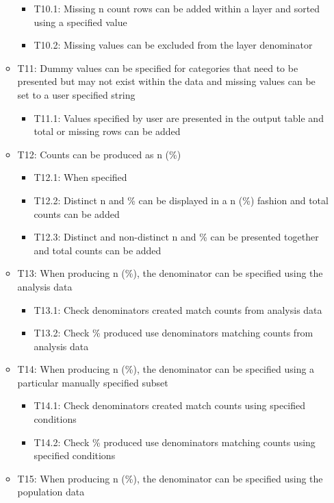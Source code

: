\documentclass[
]{article}
\providecommand{\tightlist}{%
  \setlength{\itemsep}{0pt}\setlength{\parskip}{0pt}}
\begin{document}
\begin{itemize}
\begin{itemize}
    \begin{itemize}
    \tightlist
    \item
      T10.1: Missing n count rows can be added within a layer and sorted
      using a specified value
    \item
      T10.2: Missing values can be excluded from the layer denominator
    \end{itemize}
  \item
    T11: Dummy values can be specified for categories that need to be
    presented but may not exist within the data and missing values can
    be set to a user specified string

    \begin{itemize}
    \tightlist
    \item
      T11.1: Values specified by user are presented in the output table
      and total or missing rows can be added
    \end{itemize}
  \item
    T12: Counts can be produced as n (\%)

    \begin{itemize}
    \tightlist
    \item
      T12.1: When specified
    \item
      T12.2: Distinct n and \% can be displayed in a n (\%) fashion and
      total counts can be added
    \item
      T12.3: Distinct and non-distinct n and \% can be presented
      together and total counts can be added
    \end{itemize}
  \item
    T13: When producing n (\%), the denominator can be specified using
    the analysis data

    \begin{itemize}
    \tightlist
    \item
      T13.1: Check denominators created match counts from analysis data
    \item
      T13.2: Check \% produced use denominators matching counts from
      analysis data
    \end{itemize}
  \item
    T14: When producing n (\%), the denominator can be specified using a
    particular manually specified subset

    \begin{itemize}
    \tightlist
    \item
      T14.1: Check denominators created match counts using specified
      conditions
    \item
      T14.2: Check \% produced use denominators matching counts using
      specified conditions
    \end{itemize}
  \item
    T15: When producing n (\%), the denominator can be specified using
    the population data


\end{itemize}
\end{itemize}
\end{document}
